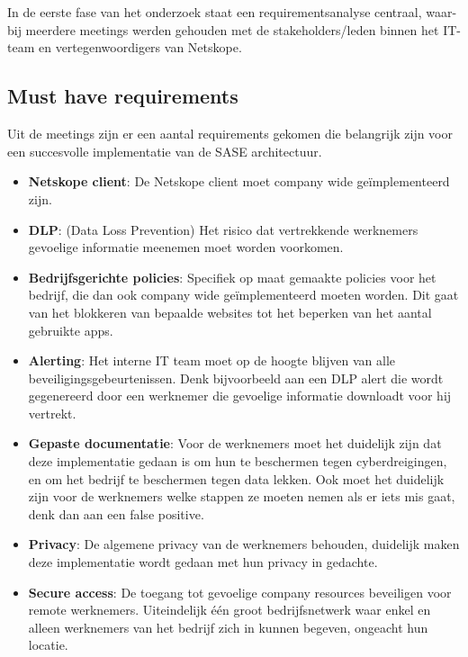 
\chapter{}%
\label{ch:requirements analyse}

In de eerste fase van het onderzoek staat een requirementsanalyse centraal, waar-
bij meerdere meetings werden gehouden met de stakeholders/leden
binnen het IT-team en vertegenwoordigers van Netskope.

\section{Must have requirements}
Uit de meetings zijn er een aantal requirements gekomen die belangrijk zijn voor een succesvolle implementatie van de SASE architectuur.
\begin{itemize}
  \item \textbf{Netskope client}: De Netskope client moet company wide geïmplementeerd zijn. 
  \item \textbf{DLP}: (Data Loss Prevention) Het risico dat vertrekkende werknemers gevoelige informatie meenemen moet worden voorkomen.
  \item \textbf{Bedrijfsgerichte policies}: Specifiek op maat gemaakte policies voor het bedrijf, die dan ook company wide geïmplementeerd moeten worden. Dit gaat van het blokkeren van bepaalde websites tot het beperken van het aantal gebruikte apps.
  \item \textbf{Alerting}: Het interne IT team moet op de hoogte blijven van alle beveiligingsgebeurtenissen. Denk bijvoorbeeld aan een DLP alert die wordt gegenereerd door een werknemer die gevoelige informatie downloadt voor hij vertrekt.
  \item \textbf{Gepaste documentatie}: Voor de werknemers moet het duidelijk zijn dat deze implementatie gedaan is om hun te beschermen tegen cyberdreigingen, en om het bedrijf te beschermen tegen data lekken. Ook moet het duidelijk zijn voor de werknemers welke stappen ze moeten nemen als er iets mis gaat, denk dan aan een false positive.
  \item \textbf{Privacy}: De algemene privacy van de werknemers behouden, duidelijk maken deze implementatie wordt gedaan met hun privacy in gedachte.
  \item \textbf{Secure access}: De toegang tot gevoelige company resources beveiligen voor remote werknemers. Uiteindelijk één groot bedrijfsnetwerk waar enkel en alleen werknemers van het bedrijf zich in kunnen begeven, ongeacht hun locatie.
\end{itemize}

